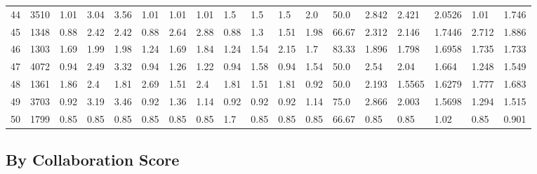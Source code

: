 \documentclass[landscape, 10pt]{report}
\begin{document}
\begin{longtable}{l || l || l | l | l | l | l | l | l | l | l | l | l || l | l | l | l | l}
44 & 3510 & 1.01 & 3.04 & 3.56 & 1.01 & 1.01 & 1.01 & 1.5 & 1.5 & 1.5 & 2.0 & 50.0 & 2.842 & 2.421 & 2.0526 & 1.01 & 1.746\\ 
\rowcolor{lightgray}45 & 1348 & 0.88 & 2.42 & 2.42 & 0.88 & 2.64 & 2.88 & 0.88 & 1.3 & 1.51 & 1.98 & 66.67 & 2.312 & 2.146 & 1.7446 & 2.712 & 1.886\\ 
46 & 1303 & 1.69 & 1.99 & 1.98 & 1.24 & 1.69 & 1.84 & 1.24 & 1.54 & 2.15 & 1.7 & 83.33 & 1.896 & 1.798 & 1.6958 & 1.735 & 1.733\\ 
\rowcolor{lightgray}47 & 4072 & 0.94 & 2.49 & 3.32 & 0.94 & 1.26 & 1.22 & 0.94 & 1.58 & 0.94 & 1.54 & 50.0 & 2.54 & 2.04 & 1.664 & 1.248 & 1.549\\ 
48 & 1361 & 1.86 & 2.4 & 1.81 & 2.69 & 1.51 & 2.4 & 1.81 & 1.51 & 1.81 & 0.92 & 50.0 & 2.193 & 1.5565 & 1.6279 & 1.777 & 1.683\\ 
\rowcolor{lightgray}49 & 3703 & 0.92 & 3.19 & 3.46 & 0.92 & 1.36 & 1.14 & 0.92 & 0.92 & 0.92 & 1.14 & 75.0 & 2.866 & 2.003 & 1.5698 & 1.294 & 1.515\\ 
50 & 1799 & 0.85 & 0.85 & 0.85 & 0.85 & 0.85 & 0.85 & 1.7 & 0.85 & 0.85 & 0.85 & 66.67 & 0.85 & 0.85 & 1.02 & 0.85 & 0.901\\ 
\end{longtable} 
 
\pagebreak\subsection*{By Collaboration Score} 
\end{document}
